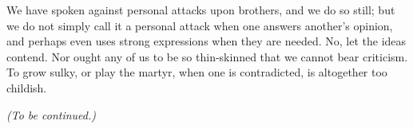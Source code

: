 We have spoken against personal attacks upon brothers, and we do so still; but we do not simply call it a personal attack when one answers another’s opinion, and perhaps even uses strong expressions when they are needed. No, let the ideas contend. Nor ought any of us to be so thin-skinned that we cannot bear criticism. To grow sulky, or play the martyr, when one is contradicted, is altogether too childish.

\textit{(To be continued.)}


